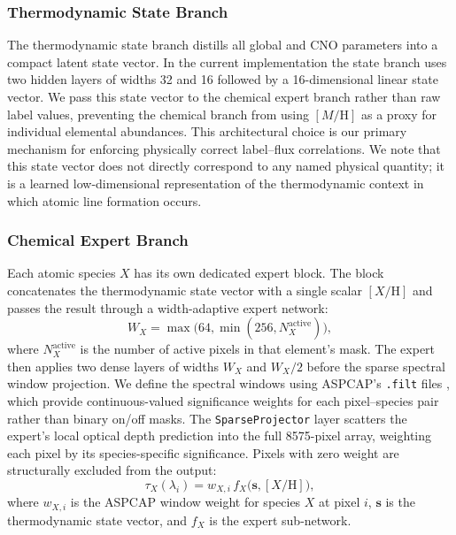 \documentclass[preprint]{aastex701-1/aastex701}
\begin{document}
\subsubsection{Thermodynamic State Branch}
The thermodynamic state branch distills all global and CNO parameters into a compact
latent state vector. In the current implementation the state branch uses two hidden layers
of widths 32 and 16 followed by a 16-dimensional linear state vector. We pass this state vector to the chemical expert
branch rather than raw label values, preventing the chemical branch from using
$[M/\mathrm{H}]$ as a proxy for individual elemental abundances. This architectural
choice is our primary mechanism for enforcing physically correct label--flux correlations.
We note that this state vector does not directly correspond to any named physical quantity;
it is a learned low-dimensional representation of the thermodynamic context in which
atomic line formation occurs.

\subsubsection{Chemical Expert Branch}
Each atomic species $X$ has its own dedicated expert block. The block concatenates the
thermodynamic state vector with a single scalar $[X/\mathrm{H}]$ and passes the result
through a width-adaptive expert network:
\begin{equation}
W_X = \max\!\bigl(64, \min(256, N^\mathrm{active}_X)\bigr),
\end{equation}
where $N^\mathrm{active}_X$ is the number of active pixels in that element's mask. The
expert then applies two dense layers of widths $W_X$ and $W_X/2$ before the sparse spectral
window projection.
We define the spectral windows using ASPCAP's \texttt{.filt} files
\citep{GarciaperezASPCAP2016,Abdurrouf2022},
which provide continuous-valued significance weights for each pixel--species pair rather
than binary on/off masks. The \texttt{SparseProjector} layer scatters the expert's local
optical depth prediction into the full 8575-pixel array, weighting each pixel by its
species-specific significance. Pixels with zero weight are structurally excluded from the
output:
\begin{equation}
\tau_X(\lambda_i) = w_{X,i} \, f_X\bigl(\mathbf{s}, [X/\mathrm{H}]\bigr),
\label{eq:mask}
\end{equation}
where $w_{X,i}$ is the ASPCAP window weight for species $X$ at pixel $i$,
$\mathbf{s}$ is the thermodynamic state vector, and $f_X$ is the expert sub-network.
\end{document}
